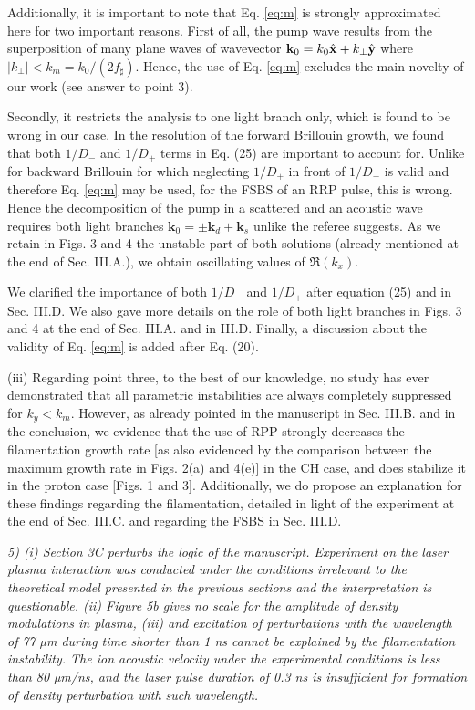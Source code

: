 \documentclass{article}
\begin{document}
Additionally, it is important to note that Eq. \eqref{eq:m} is strongly approximated here for two important reasons. First of all, the pump wave results from the superposition of many plane waves  of  wavevector $ \mathbf{k}_0 = k_0 \Hat{\mathbf{x}} + k_\perp\Hat{\mathbf{y}}  $ where $\vert k_\perp \vert< k_m=k_0/(2f_\sharp)$. Hence, the use of  Eq. \eqref{eq:m} excludes the main novelty of our work (see answer to point 3). 

Secondly, it restricts the analysis to one light branch only, which is found to be wrong in our case. 
In the resolution of the forward Brillouin growth, we found that both $1/D_-$ and $1/D_+$ terms  in Eq. (25) are important to account for. Unlike for backward Brillouin for which  neglecting $1/D_+$ in front of $1/D_-$ is valid and therefore Eq. \eqref{eq:m} may be used, for the FSBS of an RRP pulse, this is wrong.
Hence the decomposition of the pump in a scattered and an acoustic wave requires both light branches $\mathbf{k}_0=\pm \mathbf{k}_d + \mathbf{k}_s$ unlike the referee suggests. As we retain in Figs. 3 and 4 the unstable part of both  solutions (already mentioned at the end of Sec. III.A.), we obtain  oscillating values of $\Re(k_x)$.

We clarified the importance of both $1/D_-$ and $1/D_+$ after equation (25) and in Sec. III.D. We also gave more details on the role of both light branches in Figs. 3  and 4 at the end of Sec. III.A. and in III.D. Finally, a discussion about the validity of Eq. \eqref{eq:m} is added after Eq. (20). 

(iii) Regarding point three, to the best of our knowledge, no study has ever demonstrated that all parametric instabilities are always completely suppressed  for $k_y < k_m$. 
However, as already  pointed in the manuscript in Sec. III.B. and in the conclusion, we evidence that the use of RPP strongly decreases the filamentation growth rate [as also evidenced by the comparison between the maximum growth rate in Figs.  2(a) and 4(e)] in the CH case, and does stabilize it in the proton case [Figs. 1 and 3]. 
Additionally, we do propose an explanation for these findings regarding the filamentation, detailed in light of the experiment  at the end of Sec. III.C. and regarding the FSBS in Sec. III.D.

\textit{
5) (i) Section 3C perturbs the logic of the manuscript. Experiment on the laser plasma interaction was conducted under the conditions irrelevant to the theoretical model presented in the previous sections and the interpretation is questionable. (ii) Figure 5b gives no scale for the amplitude of density modulations in plasma, (iii) and excitation of perturbations with the wavelength of 77 µm during time shorter than 1 ns cannot be explained by the filamentation instability. The ion acoustic velocity under the experimental conditions is less than 80 µm/ns, and the laser pulse duration of 0.3 ns is insufficient for formation of density perturbation with such wavelength. }
\end{document}

